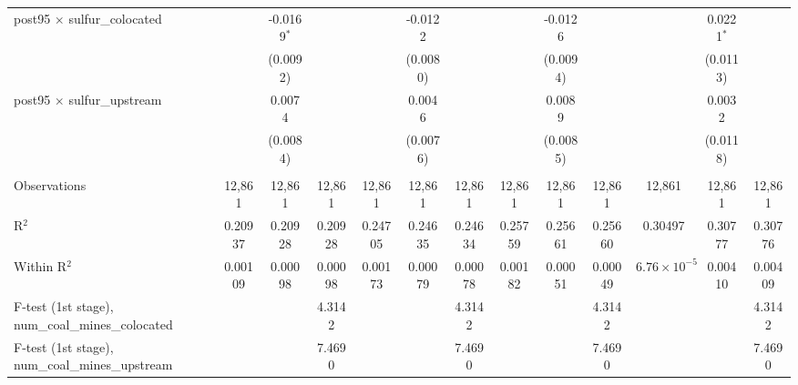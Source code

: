 \begin{table}[htbp]
\begin{adjustbox}{width = \textwidth, center}
\begin{tabular}{lcccccccccccc}
         post95 $\times$ sulfur\_colocated                  &                 & -0.0169$^{*}$ &               &                 & -0.0122       &               &               & -0.0126       &               &                       & 0.0221$^{*}$  &   \\   
                                                            &                 & (0.0092)      &               &                 & (0.0080)      &               &               & (0.0094)      &               &                       & (0.0113)      &   \\   
         post95 $\times$ sulfur\_upstream                   &                 & 0.0074        &               &                 & 0.0046        &               &               & 0.0089        &               &                       & 0.0032        &   \\   
                                                            &                 & (0.0084)      &               &                 & (0.0076)      &               &               & (0.0085)      &               &                       & (0.0118)      &   \\   
          \\
         Observations                                       & 12,861          & 12,861        & 12,861        & 12,861          & 12,861        & 12,861        & 12,861        & 12,861        & 12,861        & 12,861                & 12,861        & 12,861\\  
         R$^2$                                              & 0.20937         & 0.20928       & 0.20928       & 0.24705         & 0.24635       & 0.24634       & 0.25759       & 0.25661       & 0.25660       & 0.30497               & 0.30777       & 0.30776\\  
         Within R$^2$                                       & 0.00109         & 0.00098       & 0.00098       & 0.00173         & 0.00079       & 0.00078       & 0.00182       & 0.00051       & 0.00049       & $6.76\times 10^{-5}$  & 0.00410       & 0.00409\\  
         F-test (1st stage), num\_coal\_mines\_colocated    &                 &               & 4.3142        &                 &               & 4.3142        &               &               & 4.3142        &                       &               & 4.3142\\  
         F-test (1st stage), num\_coal\_mines\_upstream     &                 &               & 7.4690        &                 &               & 7.4690        &               &               & 7.4690        &                       &               & 7.4690\\  

\end{tabular}
\end{adjustbox}
\end{table}
